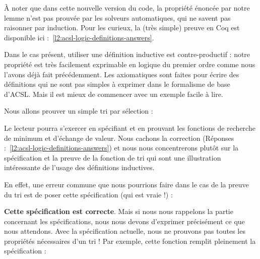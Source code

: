


À noter que dans cette nouvelle version du code, la propriété énoncée par notre
lemme n'est pas prouvée par les solveurs automatiques, qui ne savent pas raisonner
par induction. Pour les curieux, la (très simple) preuve en Coq est disponible
ici :~\ref{l2:acsl-logic-definitions-answers}.



Dans le cas présent, utiliser une définition inductive est contre-productif :
notre propriété est très facilement exprimable en logique du premier ordre comme
nous l'avons déjà fait précédemment. Les axiomatiques sont faites pour écrire
des définitions qui ne sont pas simples à exprimer dans le formalisme de base
d'ACSL. Mais il est mieux de commencer avec un exemple facile à lire.




\label{l3:acsl-logic-definitions-inductive-sort}




Nous allons prouver un simple tri par sélection :





Le lecteur pourra s'exercer en spécifiant et en prouvant les fonctions de
recherche de minimum et d'échange de valeur. Nous cachons la correction
(Réponses :~\ref{l2:acsl-logic-definitions-answers}) et nous nous concentrerons
plutôt sur la spécification et la preuve de la fonction de tri qui sont une
illustration intéressante de l'usage des définitions inductives.


En effet, une erreur commune que nous pourrions faire dans le cas de la preuve
du tri est de poser cette spécification (qui est vraie !) :






\textbf{Cette spécification est correcte}. Mais si nous nous rappelons la
partie concernant les spécifications, nous nous devons d'exprimer précisément ce
que nous attendons. Avec la spécification actuelle, nous ne prouvons pas toutes
les propriétés nécessaires d'un tri ! Par exemple, cette fonction remplit
pleinement la spécification :






